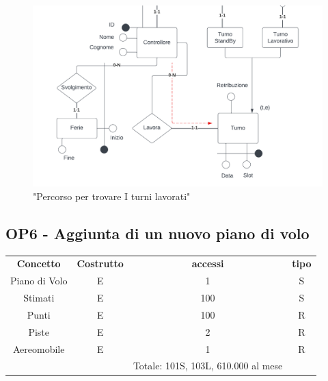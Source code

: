     \begin{figure}[H]
      \centering
      \includegraphics[width=1\textwidth]{figures/BasicControllerarrowsp2.pdf}
      \caption{"Percorso per trovare I turni lavorati"}
    \end{figure}

    \subsection*{OP6 - Aggiunta di un nuovo piano di volo}
    \begin{table}[H]
    \centering
    \begin{tabular}{cccc}
  
    \rowcolor{tableheadercolor}
    \textbf{Concetto} & \textbf{Costrutto} & \textbf{accessi} & \textbf{tipo}\\
  
    Piano di Volo & E & 1 & S \\
    Stimati & E & 100 & S \\
    Punti & E & 100 & R \\
    Piste & E & 2 & R \\
    Aereomobile & E & 1 & R \\
    & & Totale: 101S, 103L, 610.000 al mese &\\
  
    \end{tabular}
    \end{table}

